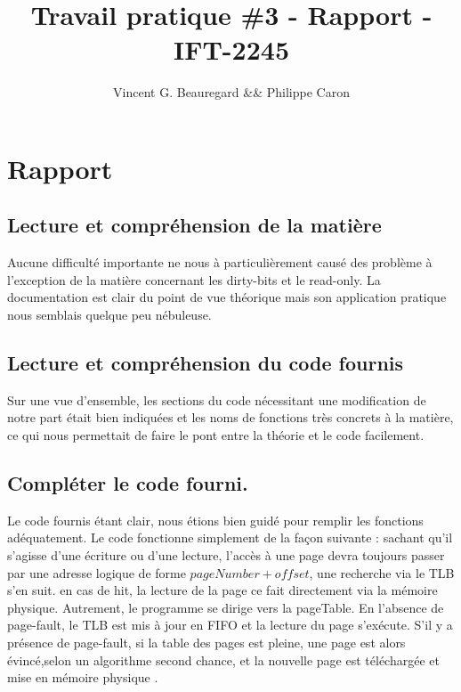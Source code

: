 \documentclass{article}
\title{Travail pratique \#3 - Rapport - IFT-2245}
\author{Vincent G. Beauregard \&\& Philippe Caron}
\begin{document}
	\maketitle
	\newpage

\section*{Rapport}
\subsection*{Lecture et compréhension de la matière}

Aucune difficulté importante ne nous à particulièrement causé des problème à l'exception de la matière concernant les dirty-bits et le read-only. La documentation est clair du point de vue théorique mais son application pratique nous semblais quelque peu nébuleuse.

\subsection*{Lecture et compréhension du code fournis}
Sur une vue d'ensemble, les sections du code nécessitant une modification de notre part était bien indiquées et les noms de fonctions très concrets à la matière, ce qui nous permettait de faire le pont entre la théorie et le code facilement.




\subsection*{Compléter le code fourni.}

Le code fournis étant clair, nous étions bien guidé pour remplir les fonctions adéquatement. Le code fonctionne simplement de la façon suivante : sachant qu'il s'agisse d'une écriture ou d'une lecture, l'accès à une page devra toujours passer par une adresse logique de forme $pageNumber + offset$, une recherche via le TLB s'en suit. en cas de hit, la lecture de la page ce fait directement via la mémoire physique. Autrement, le programme se dirige vers la pageTable. En l'absence de page-fault, le TLB est mis à jour en FIFO et la lecture du page s'exécute. S'il y a présence de page-fault, si la table des pages est pleine, une page est alors évincé,selon un algorithme second chance, et la nouvelle page est téléchargée et mise en mémoire physique . 
\end{document}
